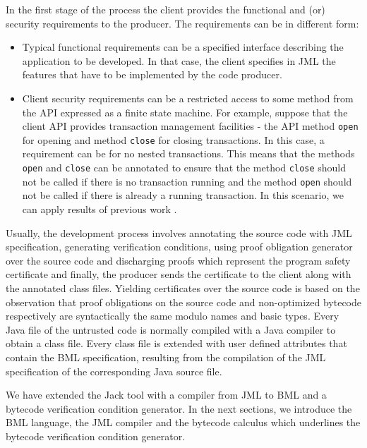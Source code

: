 In the first stage of the process the client provides the functional
and (or) security requirements to the producer.  The requirements can
be in different form:
\begin{itemize}
\item Typical functional requirements can be a specified interface
describing the application to be developed. In that case, the client
specifies in JML the features that have to be implemented by the code
producer.
\item Client security requirements can be a restricted access to some
method from the API expressed as a finite state machine.  For example,
suppose that the client API provides transaction management facilities
- the API method \texttt{open} for opening and method \texttt{close}
for closing transactions. In this case, a requirement can be for no
nested transactions.  This means that the methods \texttt{open} and
\texttt{close} can be annotated to ensure that the method
\texttt{close} should not be called if there is no transaction running
and the method \texttt{open} should not be called if there is already
a running transaction. In this scenario, we can apply results of
previous work \cite{m+04:cardis}.  
\end{itemize}
Usually, the development process involves annotating the source code
with JML specification, generating verification conditions, using
proof obligation generator over the source code and discharging proofs
which represent the program safety certificate and finally, the
producer sends the certificate to the client along with the annotated
class files.  Yielding certificates over the source code is based on
the observation that proof obligations on the source code and
non-optimized bytecode respectively are syntactically the same modulo
names and basic types. Every Java file of the untrusted code is
normally compiled with a Java compiler to obtain a class file. Every
class file is extended with user defined attributes that contain the
BML specification, resulting from the compilation of the JML
specification of the corresponding Java source file.


We have extended the Jack tool with a compiler from
 JML to BML and a bytecode verification condition generator. In the next sections, we introduce
 the BML language, the JML compiler and the bytecode \wpi calculus which underlines the bytecode verification condition generator.
 
